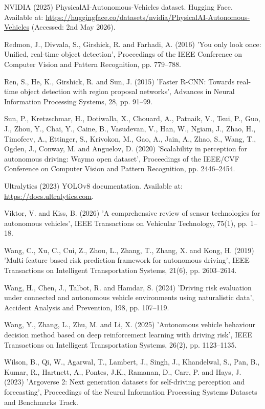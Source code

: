 \documentclass[11pt,a4paper]{article}
\begin{document}
\begin{list}{}{\setlength{\itemindent}{-1.5em}\setlength{\leftmargin}{1.5em}\setlength{\itemsep}{4pt}\setlength{\parsep}{0pt}}
\item NVIDIA (2025) PhysicalAI-Autonomous-Vehicles dataset. Hugging Face. Available at: \url{https://huggingface.co/datasets/nvidia/PhysicalAI-Autonomous-Vehicles} (Accessed: 2nd May 2026).
\item Redmon, J., Divvala, S., Girshick, R. and Farhadi, A. (2016) 'You only look once: Unified, real-time object detection', Proceedings of the IEEE Conference on Computer Vision and Pattern Recognition, pp. 779--788.
\item Ren, S., He, K., Girshick, R. and Sun, J. (2015) 'Faster R-CNN: Towards real-time object detection with region proposal networks', Advances in Neural Information Processing Systems, 28, pp. 91--99.
\item Sun, P., Kretzschmar, H., Dotiwalla, X., Chouard, A., Patnaik, V., Tsui, P., Guo, J., Zhou, Y., Chai, Y., Caine, B., Vasudevan, V., Han, W., Ngiam, J., Zhao, H., Timofeev, A., Ettinger, S., Krivokon, M., Gao, A., Jain, A., Zhao, S., Wang, T., Ogden, J., Conway, M. and Anguelov, D. (2020) 'Scalability in perception for autonomous driving: Waymo open dataset', Proceedings of the IEEE/CVF Conference on Computer Vision and Pattern Recognition, pp. 2446--2454.
\item Ultralytics (2023) YOLOv8 documentation. Available at: \url{https://docs.ultralytics.com}.
\item Viktor, V. and Kiss, B. (2026) 'A comprehensive review of sensor technologies for autonomous vehicles', IEEE Transactions on Vehicular Technology, 75(1), pp. 1--18.
\item Wang, C., Xu, C., Cui, Z., Zhou, L., Zhang, T., Zhang, X. and Kong, H. (2019) 'Multi-feature based risk prediction framework for autonomous driving', IEEE Transactions on Intelligent Transportation Systems, 21(6), pp. 2603--2614.
\item Wang, H., Chen, J., Talbot, R. and Hamdar, S. (2024) 'Driving risk evaluation under connected and autonomous vehicle environments using naturalistic data', Accident Analysis and Prevention, 198, pp. 107--119.
\item Wang, Y., Zhang, L., Zhu, M. and Li, X. (2025) 'Autonomous vehicle behaviour decision method based on deep reinforcement learning with driving risk', IEEE Transactions on Intelligent Transportation Systems, 26(2), pp. 1123--1135.
\item Wilson, B., Qi, W., Agarwal, T., Lambert, J., Singh, J., Khandelwal, S., Pan, B., Kumar, R., Hartnett, A., Pontes, J.K., Ramanan, D., Carr, P. and Hays, J. (2023) 'Argoverse 2: Next generation datasets for self-driving perception and forecasting', Proceedings of the Neural Information Processing Systems Datasets and Benchmarks Track.

\end{list}
\end{document}
